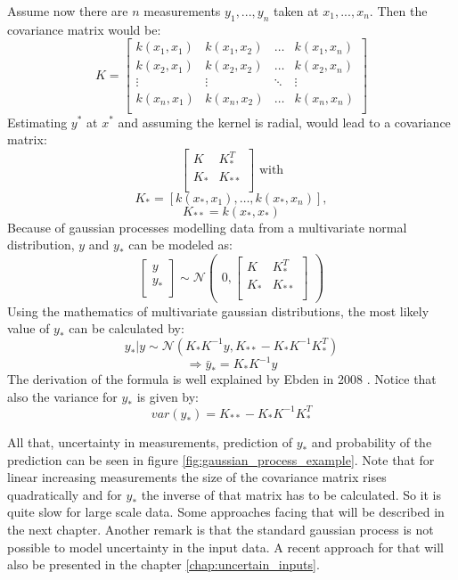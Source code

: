 Assume now there are $n$ measurements $y_1, ..., y_n$ taken at $x_1, ..., x_n$. Then the covariance matrix 
would be:
$$
K = \begin{bmatrix}
	k(x_1, x_1) & k(x_1, x_2) & \dots & k(x_1, x_n) \\
	k(x_2, x_1) & k(x_2, x_2) & \dots & k(x_2, x_n) \\
	\vdots & \vdots & \ddots & \vdots \\
	k(x_n, x_1) & k(x_n, x_2) & \dots & k(x_n, x_n) \\
\end{bmatrix}
$$
Estimating $y^*$ at $x^*$ and assuming the kernel is radial, would lead to a covariance matrix:
$$
\begin{bmatrix}
	K & K_*^T \\
	K_* & K_{**} \\
\end{bmatrix} \text{ with}
$$
$$
K_* = [k(x_*, x_1), \dots, k(x_*, x_n)],
$$
$$
K_{**} = k(x_*, x_*)
$$
Because of gaussian processes modelling data from a multivariate normal distribution, $y$ and $y_*$ 
can be modeled as:
$$
\begin{bmatrix}
	y \\
	y_* \\
\end{bmatrix} 
\sim
\mathcal{N} 
\begin{pmatrix}
	0, 
	\begin{bmatrix}
		K & K_*^T \\
		K_* & K_{**} \\
	\end{bmatrix}
\end{pmatrix}
$$
Using the mathematics of multivariate gaussian distributions, the most likely value of $y_*$ can be 
calculated by:
\newpage
$$
y_*|y \sim \mathcal{N}(K_*K^{-1}y, K_{**} - K_*K^{-1}K_*^T)
$$
$$
\Rightarrow \bar{y}_* = K_*K^{-1}y
$$
The derivation of the formula is well explained by Ebden in 2008 \cite{ebden_gaussian_2015}. Notice that
also the variance for $y_*$ is given by:
$$
var(y_*) = K_{**} - K_*K^{-1}K_*^T
$$

All that, uncertainty in measurements, prediction of $y_*$ and probability of the prediction can be seen
in figure \ref{fig:gaussian_process_example}. Note that for linear increasing measurements the size of the 
covariance matrix rises quadratically and for $y_*$ the inverse of that matrix has to be calculated. 
So it is quite slow for large scale data. Some approaches facing that will be described in the next chapter.
Another remark is that the standard gaussian process is not possible to model uncertainty in the input data.
A recent approach for that will also be presented in the chapter \ref{chap:uncertain_inputs}. 

